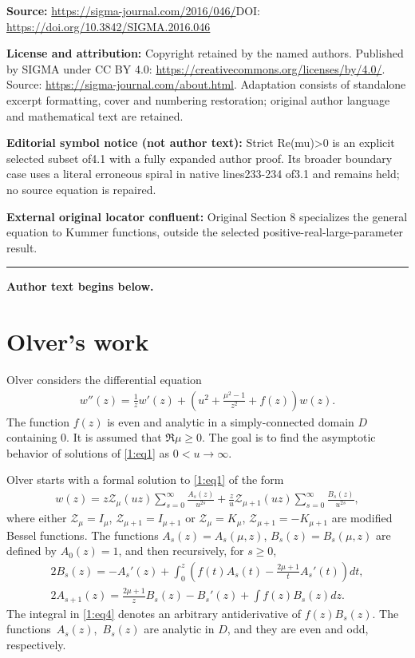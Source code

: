 \documentclass[11pt]{article}
\newcommand{\Z}{\mathbb{Z}}
\renewcommand{\Z}{\mathcal{Z}}
\numberwithin{equation}{section}
\begin{document}
\noindent\textbf{Source:} \url{https://sigma-journal.com/2016/046/}\quad DOI: \url{https://doi.org/10.3842/SIGMA.2016.046}\par
\noindent\textbf{License and attribution:} Copyright retained by the named authors. Published by SIGMA under CC BY 4.0: \url{https://creativecommons.org/licenses/by/4.0/}. Source: \url{https://sigma-journal.com/about.html}. Adaptation consists of standalone excerpt formatting, cover and numbering restoration; original author language and mathematical text are retained.\par
\noindent\textbf{Editorial symbol notice (not author text):} Strict Re(mu)>0 is an explicit selected subset of4.1 with a fully expanded author proof. Its broader boundary case uses a literal erroneous spiral in native lines233-234 of3.1 and remains held; no source equation is repaired.\par
\noindent\textbf{External original locator confluent:} Original Section 8 specializes the general equation to Kummer functions, outside the selected positive-real-large-parameter result.\par
\medskip\hrule\medskip\noindent\textbf{Author text begins below.}\par
\setcounter{section}{1}
\setcounter{subsection}{0}
\setcounter{subsubsection}{0}
\setcounter{Theorem}{0}
\setcounter{equation}{0}
\section{Olver's work}\label{Olver}
Olver \cite[(7.3)]{O} considers the dif\/ferential equation
\begin{gather}\label{1:eq1}
w''(z)=\frac1z w'(z)+\left(u^2+\frac{\mu^2-1}{z^2}+f(z)\right)w(z) .
\end{gather}
The function $f(z)$ is even and analytic in a simply-connected domain $D$ containing $0$.
It is assumed that $\Re\mu\ge 0$.
The goal is to f\/ind the asymptotic
behavior of solutions of \eqref{1:eq1} as $0<u\to\infty$.

Olver \cite[(7.4)]{O} starts with a formal solution to \eqref{1:eq1} of the form
\begin{gather*}%
 w(z)=z\Z_\mu(uz)\sum_{s=0}^\infty \frac{A_s(z)}{u^{2s}}+\frac{z}{u}\Z_{\mu+1}(uz)\sum_{s=0}^\infty \frac{B_s(z)}{u^{2s}} ,
\end{gather*}
where either $\Z_\mu=I_\mu$, $\Z_{\mu+1}=I_{\mu+1}$ or $\Z_\mu=K_\mu$, $\Z_{\mu+1}=-K_{\mu+1}$ are modif\/ied Bessel functions.
The functions $A_s(z)=A_s(\mu,z)$, $B_s(z)=B_s(\mu,z)$ are def\/ined by $A_0(z)=1$, and then recursively, for $s\ge 0$,
\begin{gather}
2B_s(z) = -A_s'(z)+\int_0^z\left(f(t)A_s(t)-\frac{2\mu+1}{t} A_s'(t)\right) dt,\label{1:eq3}\\
2A_{s+1}(z) = \frac{2\mu+1}{z} B_s(z)- B_s'(z)+\int f(z)B_s(z) dz.\label{1:eq4}
\end{gather}
The integral in \eqref{1:eq4} denotes an arbitrary antiderivative of $f(z)B_s(z)$.
The func\-tions~$A_s(z)$,~$B_s(z)$ are analytic in $D$, and they are even and odd, respectively.
\end{document}
